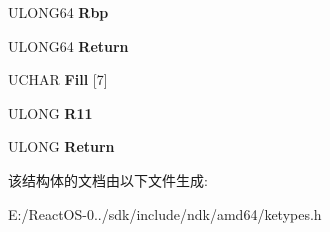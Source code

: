 \begin{DoxyCompactItemize}
U\+L\+O\+N\+G64 {\bfseries Rbp}
\item 
\mbox{\label{struct___k_s_w_i_t_c_h___f_r_a_m_e_a0a19e3c3e242c31e46bf833a899c9083}} 
U\+L\+O\+N\+G64 {\bfseries Return}
\item 
\mbox{\label{struct___k_s_w_i_t_c_h___f_r_a_m_e_a54d8d5731243ef0383e4497a56361669}} 
U\+C\+H\+AR {\bfseries Fill} \mbox{[}7\mbox{]}
\item 
\mbox{\label{struct___k_s_w_i_t_c_h___f_r_a_m_e_a22c10644d20be66da2048390b28dce73}} 
U\+L\+O\+NG {\bfseries R11}
\item 
\mbox{\label{struct___k_s_w_i_t_c_h___f_r_a_m_e_aafe09e13847d9c724d673d940ac3b040}} 
U\+L\+O\+NG {\bfseries Return}
\end{DoxyCompactItemize}


该结构体的文档由以下文件生成\+:\begin{DoxyCompactItemize}
\item 
E\+:/\+React\+O\+S-\/0../sdk/include/ndk/amd64/ketypes.\+h\end{DoxyCompactItemize}
